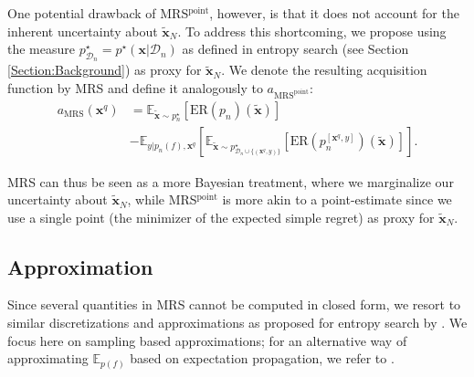 \documentclass[10pt,letterpaper]{article} %
\begin{document}
One potential drawback of MRS$^{\text{point}}$, however,  is that it does not account for
the inherent uncertainty about $\mathbf{\tilde x}_N$. To address this shortcoming, we propose using
the measure $p^\star_{\mathcal{D}_n} = p^\star(\mathbf{x} \vert \mathcal{D}_n)$ as defined in
entropy search (see Section \ref{Section:Background}) as proxy for $\mathbf{\tilde x}_N$.
We denote the resulting acquisition function by MRS and define it analogously to $a_{\text{MRS}^{\text{point}}}$:
\begin{equation*}
\begin{split}
a_{\text{MRS}}(\mathbf{x}^q)
   & = \mathbb{E}_{\mathbf{\tilde x} \sim p^\star_n}[\text{ER}(p_n)(\mathbf{\tilde x})] \\
      & - \mathbb{E}_{y \vert p_n(f), \mathbf{x}^q}[
          \mathbb{E}_{\mathbf{\tilde x} \sim p^\star_{\mathcal{D}_n \cup \{(\mathbf{x}^q, y)\}}}[
             \text{ER}(p^{[\mathbf{x}^q, y]}_n)(\mathbf{\tilde x})]].
\end{split}
\end{equation*}

MRS can thus be seen as a more Bayesian treatment, where we marginalize our
uncertainty about $\mathbf{\tilde x}_N$, while MRS$^\text{point}$ is more akin
to a point-estimate since we use a single point (the minimizer of the expected simple regret)
as proxy for $\mathbf{\tilde x}_N$.

\subsection{Approximation}
Since several quantities in MRS cannot be computed in closed form, we
resort to similar discretizations and approximations as proposed for entropy search by \citet{hennig_entropy_2012}. We
focus here on sampling based approximations; for an alternative way of approximating $\mathbb{E}_{p(f)}$ based on
expectation propagation, we refer to \citet{hennig_entropy_2012}.
\end{document}
